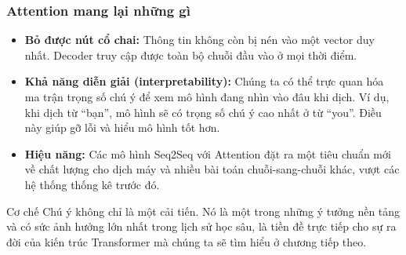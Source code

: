 \subsubsection{Attention mang lại những gì}
\begin{itemize}
    \item \textbf{Bỏ được nút cổ chai:} Thông tin không còn bị nén vào một vector duy nhất. Decoder truy cập được toàn bộ chuỗi đầu vào ở mọi thời điểm.
    \item \textbf{Khả năng diễn giải (interpretability):} Chúng ta có thể trực quan hóa ma trận trọng số chú ý để xem mô hình đang nhìn vào đâu khi dịch. Ví dụ, khi dịch từ “bạn”, mô hình sẽ có trọng số chú ý cao nhất ở từ “you”. Điều này giúp gỡ lỗi và hiểu mô hình tốt hơn.
    \item \textbf{Hiệu năng:} Các mô hình Seq2Seq với Attention đặt ra một tiêu chuẩn mới về chất lượng cho dịch máy và nhiều bài toán chuỗi-sang-chuỗi khác, vượt các hệ thống thống kê trước đó.
\end{itemize}

Cơ chế Chú ý không chỉ là một cải tiến. Nó là một trong những ý tưởng nền tảng và có sức ảnh hưởng lớn nhất trong lịch sử học sâu, là tiền đề trực tiếp cho sự ra đời của kiến trúc Transformer mà chúng ta sẽ tìm hiểu ở chương tiếp theo.
